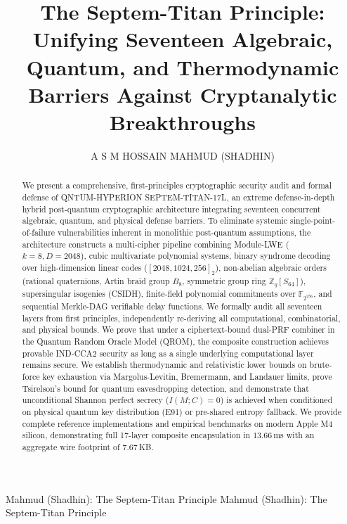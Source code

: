 \documentclass{ieeeaccess}
\newcommand{\Z}{\mathbb{Z}}
\newcommand{\F}{\mathbb{F}}
\begin{document}
\title{The Septem-Titan Principle: Unifying Seventeen Algebraic, Quantum, and Thermodynamic Barriers Against Cryptanalytic Breakthroughs}

\author{\uppercase{A S M Hossain Mahmud (Shadhin)}}

\address[1]{Department of Computer Science and Engineering, Bangladesh Army University of Science and Technology (BAUST), Saidpur 5310, Bangladesh (e-mail: sadekshadhin2000@gmail.com)}


\markboth
{Mahmud (Shadhin): The Septem-Titan Principle}
{Mahmud (Shadhin): The Septem-Titan Principle}


\begin{abstract}
We present a comprehensive, first-principles cryptographic security audit and formal defense of \textsc{QNTUM-HYPERION SEPTEM-TITAN-17L}, an extreme defense-in-depth hybrid post-quantum cryptographic architecture integrating seventeen concurrent algebraic, quantum, and physical defense barriers. To eliminate systemic single-point-of-failure vulnerabilities inherent in monolithic post-quantum assumptions, the architecture constructs a multi-cipher pipeline combining Module-LWE ($k=8, D=2048$), cubic multivariate polynomial systems, binary syndrome decoding over high-dimension linear codes ($[2048, 1024, 256]_2$), non-abelian algebraic orders (rational quaternions, Artin braid group $B_8$, symmetric group ring $\Z_q[S_{64}]$), supersingular isogenies (CSIDH), finite-field polynomial commitments over $\F_{2^{256}}$, and sequential Merkle-DAG verifiable delay functions. We formally audit all seventeen layers from first principles, independently re-deriving all computational, combinatorial, and physical bounds. We prove that under a ciphertext-bound dual-PRF combiner in the Quantum Random Oracle Model (QROM), the composite construction achieves provable IND-CCA2 security as long as a single underlying computational layer remains secure. We establish thermodynamic and relativistic lower bounds on brute-force key exhaustion via Margolus-Levitin, Bremermann, and Landauer limits, prove Tsirelson's bound for quantum eavesdropping detection, and demonstrate that unconditional Shannon perfect secrecy ($I(M; C)=0$) is achieved when conditioned on physical quantum key distribution (E91) or pre-shared entropy fallback. We provide complete reference implementations and empirical benchmarks on modern Apple M4 silicon, demonstrating full 17-layer composite encapsulation in $13.66$\,ms with an aggregate wire footprint of $7.67$\,KB.
\end{abstract}
\end{document}
